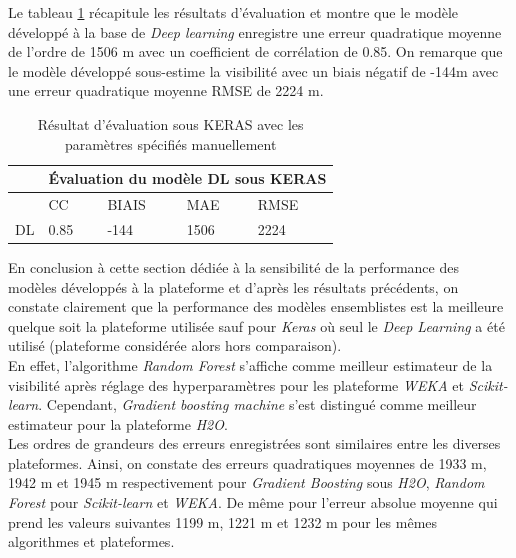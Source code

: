 Le tableau \ref{Keras_default} récapitule les résultats d'évaluation et montre que le modèle développé à la base de \textit{Deep learning} enregistre une erreur quadratique moyenne de l'ordre de 1506 m avec un coefficient de corrélation de 0.85. On remarque que le modèle développé sous-estime la visibilité avec un biais négatif de -144m avec une erreur quadratique moyenne RMSE de 2224 m.\\

\begin{table}[!ht]
    \centering
    \begin{tabular}{ |c|p{2cm}|p{2cm}|p{2cm}|p{2cm}|  }
     \hline
     & \multicolumn{4}{|c|}{Évaluation du modèle DL sous KERAS} \\
     \hline
     & CC & BIAIS & MAE & RMSE\\
     \hline
     DL & 0.85 & -144 & 1506 & 2224 \\
    \hline
    \end{tabular}
    \caption{Résultat d'évaluation sous KERAS avec les paramètres spécifiés manuellement}
    \label{Keras_default}
\end{table}

 En conclusion à cette section dédiée à la sensibilité de la performance des modèles développés à la plateforme et d'après les résultats précédents, on constate clairement que la performance des modèles ensemblistes est la meilleure quelque soit la plateforme utilisée sauf pour \textit{Keras} où seul le \textit{Deep Learning} a été utilisé (plateforme considérée alors hors comparaison). \\

En effet, l'algorithme \textit{Random Forest} s'affiche comme meilleur estimateur de la visibilité après réglage des hyperparamètres pour les plateforme \textit{WEKA} et \textit{Scikit-learn}. Cependant, \textit{Gradient boosting machine}  s'est distingué comme meilleur estimateur pour la plateforme  \textit{H2O}.\\ 

Les ordres de grandeurs des erreurs enregistrées sont similaires entre les diverses plateformes. Ainsi, on constate des erreurs quadratiques moyennes de 1933 m, 1942 m et 1945 m respectivement pour \textit{Gradient Boosting} sous \textit{H2O}, \textit{Random Forest} pour \textit{Scikit-learn} et \textit{WEKA}. De même pour l'erreur absolue moyenne qui prend les valeurs suivantes 1199 m, 1221 m et 1232 m pour les mêmes algorithmes et plateformes.


\newpage


